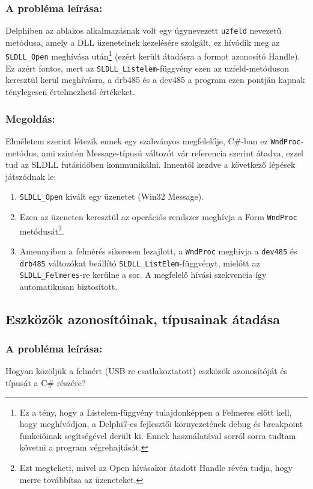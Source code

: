 \documentclass[tocnopagenum]{thesis-ekf}
\theoremstyle{definition}
\theoremstyle{remark}
\begin{document}
	\subsubsection{A probléma leírása:} Delphiben az ablakos alkalmazásnak volt egy úgynevezett \verb*|uzfeld| nevezetű metódusa, amely a DLL üzeneteinek kezelésére szolgált, ez hívódik meg az \verb*|SLDLL_Open| meghívása után\footnote{Ez a tény, hogy a Listelem-függvény tulajdonképpen a Felmeres előtt kell, hogy meghívódjon, a Delphi7-es fejlesztői környezetének debug és breakpoint funkcióinak segítségével derült ki. Ennek használatával sorról sorra tudtam követni a program végrehajtását.} (ezért került átadásra a formot azonosító Handle). Ez azért fontos, mert az \verb*|SLDLL_Listelem|-függvény ezen az uzfeld-metóduson keresztül kerül meghívásra, a drb485 és a dev485 a program ezen pontján kapnak ténylegesen értelmezhető értékeket.
	\subsubsection{Megoldás:}
	Elméletem szerint létezik ennek egy szabványos megfelelője, C\#-ban ez \verb*|WndProc|-metódus, ami szintén Message-típusú változót vár referencia szerint átadva, ezzel tud az SLDLL futásidőben kommunikálni.
	Innentől kezdve a következő lépések játszódnak le:
	\begin{enumerate}
		\item \verb*|SLDLL_Open| kivált egy üzenetet (Win32 Message).
		\item Ezen az üzeneten keresztül az operációs rendszer meghívja a Form \verb*|WndProc| metódusát\footnote{Ezt megteheti, mivel az Open hívásakor átadott Handle révén tudja, hogy merre továbbítsa az üzeneteket.}.
		\item Amennyiben a felmérés sikeresen lezajlott, a \verb*|WndProc| meghívja a \verb*|dev485| és \verb*|drb485| változókat beállító \verb*|SLDLL_ListElem|-függvényt, mielőtt az \verb*|SLDLL_Felmeres|-re kerülne a sor. A megfelelő hívási szekvencia így automatikusan biztosított.
	\end{enumerate}
	\subsection{Eszközök azonosítóinak, típusainak átadása}
	\subsubsection{A probléma leírása:} Hogyan közöljük a felmért (USB-re csatlakoztatott) eszközök azonosítóját és típusát a C\# részére?
\end{document}
